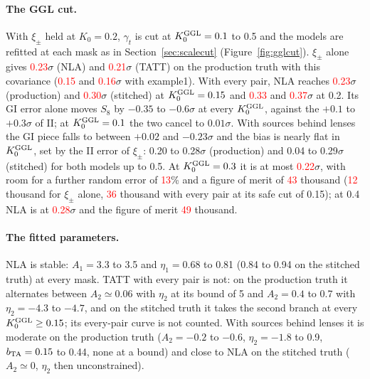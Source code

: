 \documentclass[11pt]{article}
\newif\ifnumbersfinal
\newcommand{\refresh}[1]{\ifnumbersfinal#1\else\textcolor{red}{#1}\fi}
\newcommand{\GGLcsNLA}{\refresh{0.23}}
\newcommand{\GGLcsTATT}{\refresh{0.21}}
\newcommand{\GGLcsNLAex}{\refresh{0.15}}
\newcommand{\GGLcsTATTex}{\refresh{0.16}}
\newcommand{\GGLallNLAFifteen}{\refresh{0.23}}
\newcommand{\GGLallNLAFifteenS}{\refresh{0.30}}
\newcommand{\GGLallNLATwo}{\refresh{0.33}}
\newcommand{\GGLallNLATwoS}{\refresh{0.37}}
\newcommand{\GGLbehMaxThree}{\refresh{0.22}}
\newcommand{\GGLbehNLAFour}{\refresh{0.28}}
\newcommand{\GGLbehRoomThree}{\refresh{13}}
\newcommand{\GGLFoMcs}{\refresh{12}}
\newcommand{\GGLFoMallFifteen}{\refresh{36}}
\newcommand{\GGLFoMbehThree}{\refresh{43}}
\newcommand{\GGLFoMbehFour}{\refresh{49}}
\begin{document}
\paragraph{The GGL cut.}
With $\xi_\pm$ held at $K_0 = 0.2$, $\gamma_t$ is cut at $K_0^{\rm GGL} =
0.1$ to 0.5 and the models are refitted at each mask as in
Section~\ref{sec:scalecut} (Figure~\ref{fig:gglcut}). $\xi_\pm$ alone gives
\GGLcsNLA$\sigma$ (NLA) and \GGLcsTATT$\sigma$ (TATT) on the production
truth with this covariance (\GGLcsNLAex{} and \GGLcsTATTex$\sigma$ with
example1). With every pair, NLA reaches \GGLallNLAFifteen$\sigma$
(production) and \GGLallNLAFifteenS$\sigma$ (stitched) at $K_0^{\rm GGL} =
0.15$ and \GGLallNLATwo{} and \GGLallNLATwoS$\sigma$ at 0.2. Its GI error
alone moves $S_8$ by $-0.35$ to $-0.6\sigma$ at every $K_0^{\rm GGL}$,
against the $+0.1$ to $+0.3\sigma$ of II; at $K_0^{\rm GGL} = 0.1$ the two
cancel to $0.01\sigma$. With sources behind lenses the GI piece falls to
between $+0.02$ and $-0.23\sigma$ and the bias is nearly flat in $K_0^{\rm
GGL}$, set by the II error of $\xi_\pm$: 0.20 to 0.28$\sigma$ (production)
and 0.04 to 0.29$\sigma$ (stitched) for both models up to 0.5. At
$K_0^{\rm GGL} = 0.3$ it is at most \GGLbehMaxThree$\sigma$, with room for a
further random error of \GGLbehRoomThree\% and a figure of merit of
\GGLFoMbehThree{} thousand (\GGLFoMcs{} thousand for $\xi_\pm$ alone,
\GGLFoMallFifteen{} thousand with every pair at its safe cut of 0.15); at
0.4 NLA is at \GGLbehNLAFour$\sigma$ and the figure of merit
\GGLFoMbehFour{} thousand.

\paragraph{The fitted parameters.}
NLA is stable: $A_1 = 3.3$ to 3.5 and $\eta_1 = 0.68$ to 0.81 (0.84 to
0.94 on the stitched truth) at every mask. TATT with every pair is not: on
the production truth it alternates between $A_2 \simeq 0.06$ with $\eta_2$
at its bound of 5 and $A_2 = 0.4$ to 0.7 with $\eta_2 = -4.3$ to $-4.7$,
and on the stitched truth it takes the second branch at every
$K_0^{\rm GGL} \ge 0.15$; its every-pair curve is not counted. With sources
behind lenses it is moderate on the production truth ($A_2 = -0.2$ to
$-0.6$, $\eta_2 = -1.8$ to 0.9, $b_{\rm TA} = 0.15$ to 0.44, none at a
bound) and close to NLA on the stitched truth ($A_2 \simeq 0$, $\eta_2$
then unconstrained).
\end{document}
